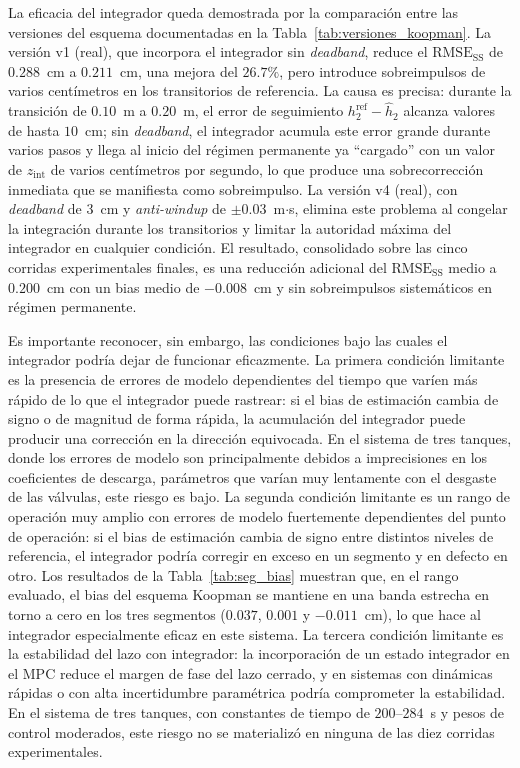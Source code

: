 \documentclass[12pt,letterpaper]{article}
\begin{document}
La eficacia del integrador queda demostrada por la comparación 
entre las versiones del esquema documentadas en la 
Tabla~\ref{tab:versiones_koopman}. La versión v1 (real), que 
incorpora el integrador sin \textit{deadband}, reduce el 
$\mathrm{RMSE}_{\mathrm{SS}}$ de $0.288$~cm a $0.211$~cm, una 
mejora del $26.7\%$, pero introduce sobreimpulsos de varios 
centímetros en los transitorios de referencia. La causa es 
precisa: durante la transición de $0.10$~m a $0.20$~m, el error 
de seguimiento $h_2^{\mathrm{ref}} - \hat{h}_2$ alcanza valores 
de hasta $10$~cm; sin \textit{deadband}, el integrador acumula 
este error grande durante varios pasos y llega al inicio del 
régimen permanente ya ``cargado'' con un valor de $z_{\mathrm{int}}$ 
de varios centímetros por segundo, lo que produce una 
sobrecorrección inmediata que se manifiesta como sobreimpulso. 
La versión v4 (real), con \textit{deadband} de $3$~cm y 
\textit{anti-windup} de $\pm 0.03$~m$\cdot$s, elimina este 
problema al congelar la integración durante los transitorios y 
limitar la autoridad máxima del integrador en cualquier condición. 
El resultado, consolidado sobre las cinco corridas experimentales 
finales, es una reducción adicional del $\mathrm{RMSE}_{\mathrm{SS}}$ 
medio a $0.200$~cm con un bias medio de $-0.008$~cm y sin 
sobreimpulsos sistemáticos en régimen permanente.

Es importante reconocer, sin embargo, las condiciones bajo las 
cuales el integrador podría dejar de funcionar eficazmente. La 
primera condición limitante es la presencia de errores de modelo 
dependientes del tiempo que varíen más rápido de lo que el 
integrador puede rastrear: si el bias de estimación cambia de 
signo o de magnitud de forma rápida, la acumulación del integrador 
puede producir una corrección en la dirección equivocada. En el 
sistema de tres tanques, donde los errores de modelo son 
principalmente debidos a imprecisiones en los coeficientes de
descarga, parámetros que varían muy lentamente con el desgaste
de las válvulas, este riesgo es bajo. La segunda condición
limitante es un rango de operación muy amplio con errores de 
modelo fuertemente dependientes del punto de operación: si el 
bias de estimación cambia de signo entre distintos niveles de 
referencia, el integrador podría corregir en exceso en un segmento 
y en defecto en otro. Los resultados de la 
Tabla~\ref{tab:seg_bias} muestran que, en el rango evaluado, el 
bias del esquema Koopman se mantiene en una banda estrecha en 
torno a cero en los tres segmentos ($0.037$, $0.001$ y 
$-0.011$~cm), lo que hace al integrador especialmente eficaz 
en este sistema. La tercera condición limitante es la estabilidad 
del lazo con integrador: la incorporación de un estado integrador 
en el MPC reduce el margen de fase del lazo cerrado, y en sistemas 
con dinámicas rápidas o con alta incertidumbre paramétrica podría 
comprometer la estabilidad. En el sistema de tres tanques, con 
constantes de tiempo de $200$--$284$~s y pesos de control 
moderados, este riesgo no se materializó en ninguna de las diez 
corridas experimentales.
\end{document}
